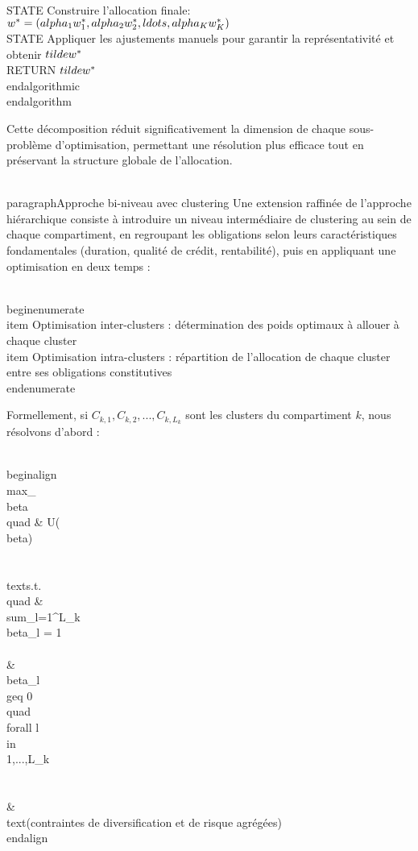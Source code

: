 \\STATE Construire l'allocation finale: $w^* = (\\alpha_1 w_1^*, \\alpha_2 w_2^*, \\ldots, \\alpha_K w_K^*)$
\\STATE Appliquer les ajustements manuels pour garantir la représentativité et obtenir $\\tilde{w}^*$
\\RETURN $\\tilde{w}^*$
\\end{algorithmic}
\\end{algorithm}

Cette décomposition réduit significativement la dimension de chaque sous-problème d'optimisation, permettant une résolution plus efficace tout en préservant la structure globale de l'allocation.

\\paragraph{Approche bi-niveau avec clustering}
Une extension raffinée de l'approche hiérarchique consiste à introduire un niveau intermédiaire de clustering au sein de chaque compartiment, en regroupant les obligations selon leurs caractéristiques fondamentales (duration, qualité de crédit, rentabilité), puis en appliquant une optimisation en deux temps :

\\begin{enumerate}
    \\item Optimisation inter-clusters : détermination des poids optimaux à allouer à chaque cluster
    \\item Optimisation intra-clusters : répartition de l'allocation de chaque cluster entre ses obligations constitutives
\\end{enumerate}

Formellement, si $C_{k,1}, C_{k,2}, ..., C_{k,L_k}$ sont les clusters du compartiment $k$, nous résolvons d'abord :

\\begin{align}
\\max_{\\beta} \\quad & U(\\beta) \\\\
\\text{s.t.} \\quad & \\sum_{l=1}^{L_k} \\beta_l = 1 \\\\
& \\beta_l \\geq 0 \\quad \\forall l \\in \\{1,...,L_k\\} \\\\
& \\text{(contraintes de diversification et de risque agrégées)}
\\end{align}

